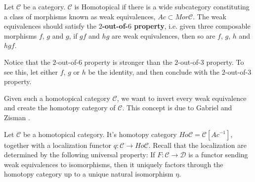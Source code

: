 \documentclass[../thesis.tex]{subfiles}
\begin{document}
            \begin{definition}
                Let $\mathcal{C}$ be a category. $\mathcal{C}$ is Homotopical if there is a wide subcategory constituting a class of morphisms known as weak equivalences, $Ac\subset Mor\mathcal{C}$. The weak equivalences should satisfy the \textbf{$2$-out-of-$6$ property}, i.e. given three composable morphisms $f$, $g$ and $g$, if $gf$ and $hg$ are weak equivalences, then so are $f$, $g$, $h$ and $hgf$.

                \begin{center}
                \end{center}
            \end{definition}

            \begin{remark}
                Notice that the $2$-out-of-$6$ property is stronger than the $2$-out-of-$3$ property. To see this, let either $f$, $g$ or $h$ be the identity, and then conclude with the $2$-out-of-$3$ property.
            \end{remark}
            
            Given such a homotopical category $\mathcal{C}$, we want to invert every weak equivalence and create the homotopy category of $\mathcal{C}$. This concept is due to Gabriel and Zisman .

            \begin{definition}
                Let $\mathcal{C}$ be a homotopical category. It's homotopy category $Ho\mathcal{C} = \mathcal{C}[Ac^{-1}]$, together with a localization functor $q:\mathcal{C}\rightarrow Ho\mathcal{C}$. Recall that the localization are determined by the following universal property: If $F:\mathcal{C}\rightarrow \mathcal{D}$ is a functor sending weak equivalences to isomorphisms, then it uniquely factors through the homotopy category up to a unique natural isomorphism $\eta$.

                \begin{center}
                \end{center}
            \end{definition}
\end{document}
